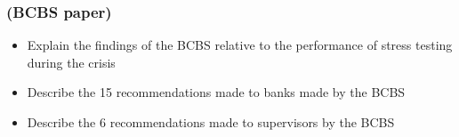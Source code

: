 \subsubsection*{(BCBS paper)}
\begin{itemize}
\item Explain the findings of the BCBS relative to the performance of stress testing during the crisis
\item Describe the 15 recommendations made to banks made by the BCBS
\item Describe the 6 recommendations made to supervisors by the BCBS
\end{itemize}
